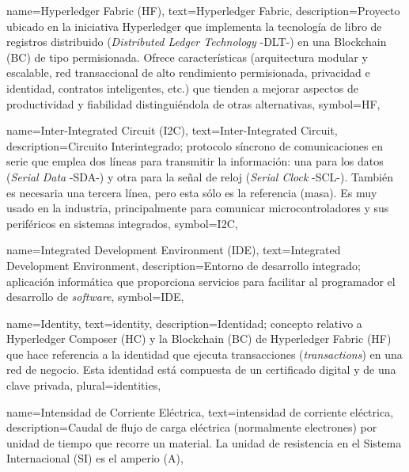 {
    name={Hyperledger Fabric (HF)},
    text={Hyperledger Fabric},
    description={Proyecto ubicado en la iniciativa Hyperledger que implementa la tecnología de libro de registros distribuido (\textit{Distributed Ledger Technology} -DLT-) en una Blockchain (BC) de tipo permisionada. Ofrece características (arquitectura modular y escalable, red transaccional de alto rendimiento permisionada, privacidad e identidad, contratos inteligentes, etc.) que tienden a mejorar aspectos de productividad y fiabilidad distinguiéndola de otras alternativas},
    symbol={HF},
}

{
    name={Inter-Integrated Circuit (I2C)},
    text={Inter-Integrated Circuit},
    description={Circuito Interintegrado; protocolo síncrono de comunicaciones en serie que emplea dos líneas para transmitir la información: una para los datos (\textit{Serial Data} -SDA-) y otra para la señal de reloj (\textit{Serial Clock} -SCL-). También es necesaria una tercera línea, pero esta sólo es la referencia (masa). Es muy usado en la industria, principalmente para comunicar microcontroladores y sus periféricos en sistemas integrados},
    symbol={I2C},
}

{
    name={Integrated Development Environment (IDE)},
    text={Integrated Development Environment},
    description={Entorno de desarrollo integrado; aplicación informática que proporciona servicios para facilitar al programador el desarrollo de \textit{software}},
    symbol={IDE},
}

{
    name={Identity},
    text={identity},
    description={Identidad; concepto relativo a Hyperledger Composer (HC) y la Blockchain (BC) de Hyperledger Fabric (HF) que hace referencia a la identidad que ejecuta transacciones (\textit{transactions}) en una red de negocio. Esta identidad está compuesta de un certificado digital y de una clave privada},
    plural={identities},
}
	
{
    name={Intensidad de Corriente Eléctrica},
    text={intensidad de corriente eléctrica},
    description={Caudal de flujo de carga eléctrica (normalmente electrones) por unidad de tiempo que recorre un material. La unidad de resistencia en el Sistema Internacional (SI) es el amperio (A)},
}

